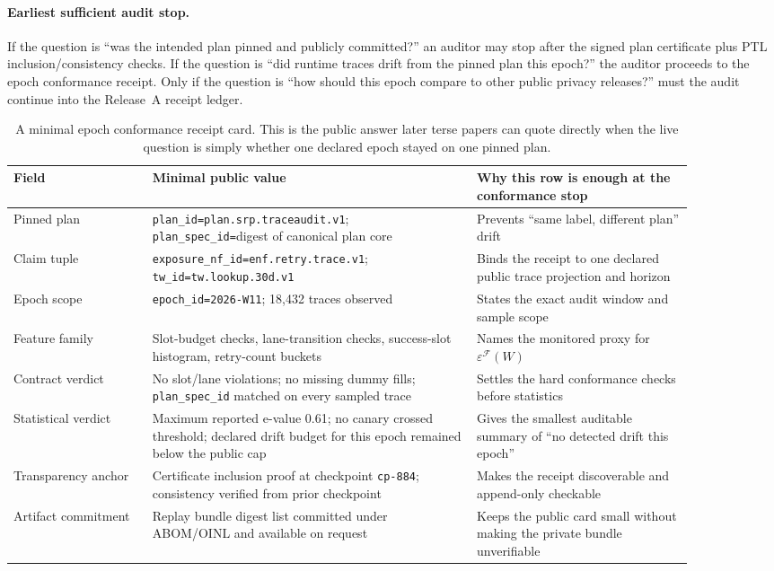 \documentclass[11pt]{article}
\begin{document}
\paragraph{Earliest sufficient audit stop.}
If the question is ``was the intended plan pinned and publicly committed?'' an auditor may stop after the signed plan certificate plus PTL inclusion/consistency checks.
If the question is ``did runtime traces drift from the pinned plan this epoch?'' the auditor proceeds to the epoch conformance receipt.
Only if the question is ``how should this epoch compare to other public privacy releases?'' must the audit continue into the Release~A receipt ledger.

\begin{table}[t]
\centering\small
\begin{tabular}{@{}L{0.18\linewidth}L{0.42\linewidth}L{0.28\linewidth}@{}}
\toprule
Field & Minimal public value & Why this row is enough at the conformance stop \\
\midrule
Pinned plan & \texttt{plan\_id=plan.srp.traceaudit.v1}; \texttt{plan\_spec\_id=}digest of canonical plan core & Prevents ``same label, different plan'' drift \\
Claim tuple & \texttt{exposure\_nf\_id=enf.retry.trace.v1}; \texttt{tw\_id=tw.lookup.30d.v1} & Binds the receipt to one declared public trace projection and horizon \\
Epoch scope & \texttt{epoch\_id=2026-W11}; 18{,}432 traces observed & States the exact audit window and sample scope \\
Feature family & Slot-budget checks, lane-transition checks, success-slot histogram, retry-count buckets & Names the monitored proxy for \(\varepsilon^{\mathcal F}(W)\) \\
Contract verdict & No slot/lane violations; no missing dummy fills; \texttt{plan\_spec\_id} matched on every sampled trace & Settles the hard conformance checks before statistics \\
Statistical verdict & Maximum reported e-value 0.61; no canary crossed threshold; declared drift budget for this epoch remained below the public cap & Gives the smallest auditable summary of ``no detected drift this epoch'' \\
Transparency anchor & Certificate inclusion proof at checkpoint \texttt{cp-884}; consistency verified from prior checkpoint & Makes the receipt discoverable and append-only checkable \\
Artifact commitment & Replay bundle digest list committed under ABOM/OINL and available on request & Keeps the public card small without making the private bundle unverifiable \\
\bottomrule
\end{tabular}
\caption{A minimal epoch conformance receipt card. This is the public answer later terse papers can quote directly when the live question is simply whether one declared epoch stayed on one pinned plan.}
\label{tab:minimal-epoch-card}
\end{table}
\end{document}
